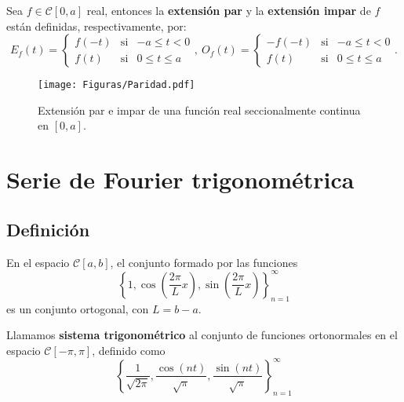 \begin{defi}
Sea $f \in \mathscr{C}[0,a]$ real, entonces la \textbf{extensión par} y la \textbf{extensión impar} de $f$ están definidas, respectivamente, por:
\begin{equation*}
    E_f(t) = \left\{ \begin{array}{cll}
    f(-t)     & \mbox{si} & -a \leq t < 0 \\
    f(t)     & \mbox{si} & 0 \leq t \leq a
    \end{array} \right. , ~ O_f(t) = \left\{ \begin{array}{cll}
    -f(-t)     & \mbox{si} & -a \leq t < 0 \\
    f(t)     & \mbox{si} & 0 \leq t \leq a
    \end{array} \right. .
\end{equation*}
\end{defi}

\begin{figure}[H]
    \centering
    \texttt{[image: Figuras/Paridad.pdf]}
    \caption{Extensión par e impar de una función real seccionalmente continua en $[0,a]$. }
\end{figure}

\section{Serie de Fourier trigonométrica}

\subsection{Definición}

\begin{propo}
    En el espacio $\mathscr{C}[a,b]$, el conjunto formado por las funciones
    $$\left\{ 1, \cos\left( \frac{2\pi}{L}x \right), \sin\left( \frac{2\pi}{L}x \right) \right\}_{n=1}^{\infty}$$
    es un conjunto ortogonal, con $L = b-a$.
\end{propo}


\begin{defi}
    Llamamos \textbf{sistema trigonométrico} al conjunto de funciones ortonormales en el espacio $\mathscr{C}[-\pi,\pi]$, definido como
    $$\left\{ \frac{1}{\sqrt{2\pi}}, \frac{\cos(nt)}{\sqrt{\pi}}, \frac{\sin(nt)}{\sqrt{\pi}} \right\}_{n=1}^{\infty}$$
\end{defi}


